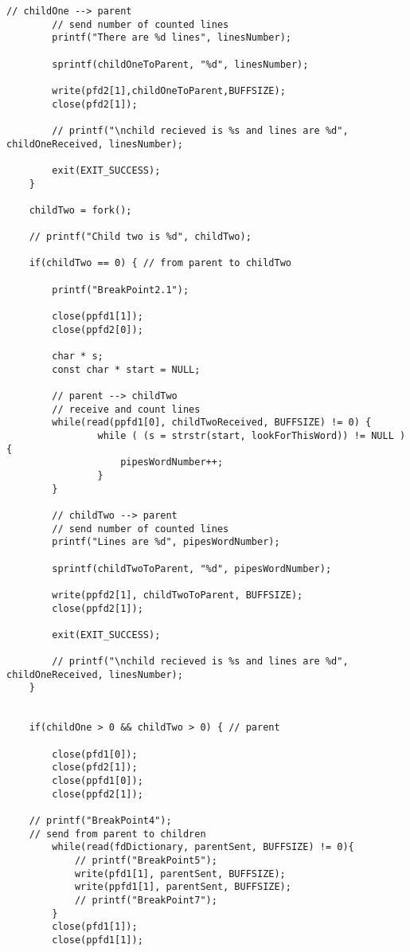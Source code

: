 \documentclass[a4paper,15pt]{article}
\begin{document}
\begin{lstlisting}[style=CStyle, label=some-code, caption=Komunikacja z kilkoma procesami.]
        // childOne --> parent
        // send number of counted lines
        printf("There are %d lines", linesNumber);

        sprintf(childOneToParent, "%d", linesNumber);
       
        write(pfd2[1],childOneToParent,BUFFSIZE);
        close(pfd2[1]);
        
        // printf("\nchild recieved is %s and lines are %d", childOneReceived, linesNumber);

        exit(EXIT_SUCCESS);
    }

    childTwo = fork();

    // printf("Child two is %d", childTwo);

    if(childTwo == 0) { // from parent to childTwo

        printf("BreakPoint2.1");

        close(ppfd1[1]);
        close(ppfd2[0]);

        char * s;
        const char * start = NULL;

        // parent --> childTwo
        // receive and count lines
        while(read(ppfd1[0], childTwoReceived, BUFFSIZE) != 0) {
                while ( (s = strstr(start, lookForThisWord)) != NULL ) {
                    pipesWordNumber++;
                }
        }

        // childTwo --> parent
        // send number of counted lines
        printf("Lines are %d", pipesWordNumber);

        sprintf(childTwoToParent, "%d", pipesWordNumber);
       
        write(ppfd2[1], childTwoToParent, BUFFSIZE);
        close(ppfd2[1]);

        exit(EXIT_SUCCESS);
        
        // printf("\nchild recieved is %s and lines are %d", childOneReceived, linesNumber);
    }


    if(childOne > 0 && childTwo > 0) { // parent
        
        close(pfd1[0]);
        close(pfd2[1]);
        close(ppfd1[0]);
        close(ppfd2[1]);

    // printf("BreakPoint4");
    // send from parent to children
        while(read(fdDictionary, parentSent, BUFFSIZE) != 0){
            // printf("BreakPoint5");
            write(pfd1[1], parentSent, BUFFSIZE);
            write(ppfd1[1], parentSent, BUFFSIZE);
            // printf("BreakPoint7");
        }
        close(pfd1[1]);
        close(ppfd1[1]);


\end{lstlisting}
\end{document}
